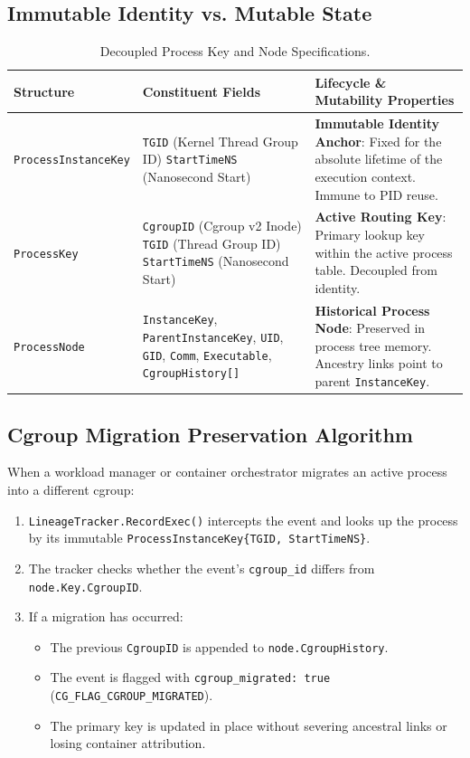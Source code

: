 \documentclass[11pt,a4paper]{article}
\begin{document}
\subsection{Immutable Identity vs. Mutable State}
\begin{table}[htbp]
\centering
\small
\begin{tabularx}{\textwidth}{l p{4.0cm} X}
\toprule
\textbf{Structure} & \textbf{Constituent Fields} & \textbf{Lifecycle \& Mutability Properties} \\
\midrule
\texttt{ProcessInstanceKey} & \texttt{TGID} (Kernel Thread Group ID) \newline \texttt{StartTimeNS} (Nanosecond Start) & \textbf{Immutable Identity Anchor}: Fixed for the absolute lifetime of the execution context. Immune to PID reuse. \\
\midrule
\texttt{ProcessKey} & \texttt{CgroupID} (Cgroup v2 Inode) \newline \texttt{TGID} (Thread Group ID) \newline \texttt{StartTimeNS} (Nanosecond Start) & \textbf{Active Routing Key}: Primary lookup key within the active process table. Decoupled from identity. \\
\midrule
\texttt{ProcessNode} & \texttt{InstanceKey}, \texttt{ParentInstanceKey}, \texttt{UID}, \texttt{GID}, \texttt{Comm}, \texttt{Executable}, \texttt{CgroupHistory[]} & \textbf{Historical Process Node}: Preserved in process tree memory. Ancestry links point to parent \texttt{InstanceKey}. \\
\bottomrule
\end{tabularx}
\caption{Decoupled Process Key and Node Specifications.}
\label{tab:process_keys}
\end{table}

\subsection{Cgroup Migration Preservation Algorithm}
When a workload manager or container orchestrator migrates an active process into a different cgroup:
\begin{enumerate}
    \item \texttt{LineageTracker.RecordExec()} intercepts the event and looks up the process by its immutable \texttt{ProcessInstanceKey\{TGID, StartTimeNS\}}.
    \item The tracker checks whether the event's \texttt{cgroup\_id} differs from \texttt{node.Key.CgroupID}.
    \item If a migration has occurred:
    \begin{itemize}
        \item The previous \texttt{CgroupID} is appended to \texttt{node.CgroupHistory}.
        \item The event is flagged with \texttt{cgroup\_migrated: true} (\texttt{CG\_FLAG\_CGROUP\_MIGRATED}).
        \item The primary key is updated in place without severing ancestral links or losing container attribution.
    \end{itemize}
\end{enumerate}
\end{document}
